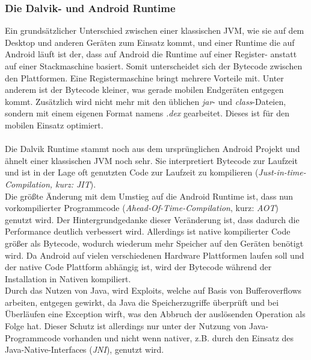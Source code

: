 \subsubsection{Die Dalvik- und Android Runtime}
	Ein grundsätzlicher Unterschied zwischen einer klassischen JVM, wie sie auf dem Desktop und anderen Geräten zum Einsatz kommt, und einer Runtime die auf Android läuft ist der, dass auf Android die Runtime auf einer Register- anstatt auf einer Stackmaschine basiert\cite{DalvikBytecode}. Somit unterscheidet sich der Bytecode zwischen den Plattformen. Eine Registermaschine bringt mehrere Vorteile mit. Unter anderem ist der Bytecode kleiner, was gerade mobilen Endgeräten entgegen kommt.
	Zusätzlich wird nicht mehr mit den üblichen \textit{jar}- und \textit{class}-Dateien, sondern mit einem eigenen Format namens \textit{.dex} gearbeitet\cite{DexFormat}. Dieses ist für den mobilen Einsatz optimiert.\\\\
	Die Dalvik Runtime stammt noch aus dem ursprünglichen Android Projekt und ähnelt einer klassischen JVM noch sehr. Sie interpretiert Bytecode zur Laufzeit und ist in der Lage oft genutzten Code zur Laufzeit zu kompilieren (\textit{Just-in-time-Compilation, kurz: JIT}). \\
	Die größte Änderung mit dem Umstieg auf die Android Runtime ist, dass nun vorkompilierter Programmcode (\textit{Ahead-Of-Time-Compilation}, kurz: \textit{AOT}) genutzt wird. Der Hintergrundgedanke dieser Veränderung ist, dass dadurch die Performance deutlich verbessert wird. Allerdings ist native kompilierter Code größer als Bytecode, wodurch wiederum mehr Speicher auf den Geräten benötigt wird.
	Da Android auf vielen verschiedenen Hardware Plattformen laufen soll und der native Code Plattform abhängig ist, wird der Bytecode während der Installation in Nativen kompiliert.\\
	Durch das Nutzen von Java, wird Exploits, welche auf Basis von Bufferoverflows arbeiten, entgegen gewirkt, da Java die Speicherzugriffe überprüft und bei Überläufen eine Exception wirft, was den Abbruch der auslösenden Operation als Folge hat. Dieser Schutz ist allerdings nur unter der Nutzung von Java-Programmcode vorhanden und nicht wenn nativer, z.B. durch den Einsatz des Java-Native-Interfaces (\textit{JNI}), genutzt wird.